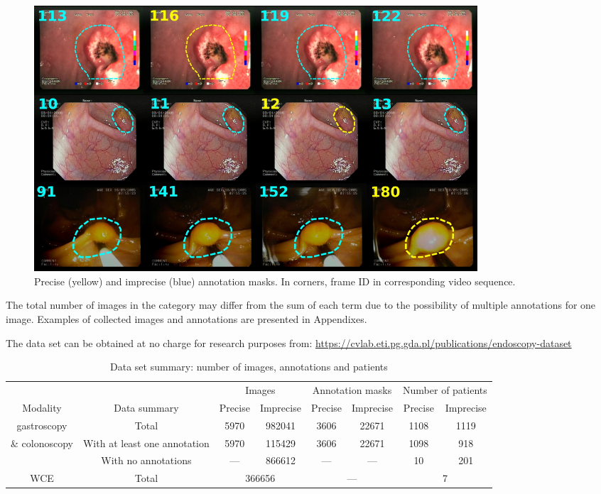 \documentclass[preprint]{article}
\newif\ifanon
\renewcommand{\onecolumn}{}
\newcommand{\tabletextsize}{\tiny}
\begin{document}
\begin{figure}[ht]
\centering
\includegraphics[width=0.8\textwidth]{imprecise}
\caption{Precise (yellow) and imprecise (blue) annotation masks. In corners, frame ID in corresponding video sequence.}
\label{fig:imprecise}
\end{figure}


The total number of images in the category may differ from the sum of each term due to the possibility of multiple annotations for one image. Examples of collected images and annotations are presented in Appendixes.

The data set can be obtained at no charge for research purposes from: \newline
\ifanon https://hidden.anonymized.link/ (ANONYMIZED) \else \href{https://cvlab.eti.pg.gda.pl/publications/endoscopy-dataset}{https://cvlab.eti.pg.gda.pl/publications/endoscopy-dataset}\fi

\onecolumn

\tabletextsize

\begin{longtable}{c|c|c|c|c|c|c|c}
\caption{Data set summary: number of images, annotations and patients}\label{tab:data-summary}\\

\multicolumn{2}{c|}{} & \multicolumn{2}{c|}{Images} & \multicolumn{2}{c|}{Annotation masks} & \multicolumn{2}{c}{Number of patients} \\
Modality & Data summary & Precise & Imprecise & Precise & Imprecise & Precise & Imprecise \\
 
 \hline

gastroscopy & Total & 5970 & 982041 & 3606 & 22671 & 1108 & 1119 \\  
\& colonoscopy & With at least one annotation & 5970 & 115429 & 3606 & 22671 & 1098 & 918 \\ 
& With no annotations & --- & 866612 & --- & --- & 10 & 201 \\ 
\hline

WCE & Total & \multicolumn{2}{c|}{366656} & \multicolumn{2}{c|}{---} &  \multicolumn{2}{c}{7}  \\ 

\end{longtable}
\end{document}
